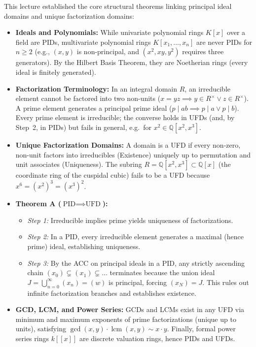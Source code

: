 \begin{overview}
This lecture established the core structural theorems linking principal ideal domains and unique factorization domains:
\begin{itemize}
    \item \textbf{Ideals and Polynomials:} While univariate polynomial rings $K[x]$ over a field are PIDs, multivariate polynomial rings $K[x_1, \dots, x_n]$ are never PIDs for $n \ge 2$ (e.g., $(x, y)$ is non-principal, and $(x^2, xy, y^2)$ requires three generators). By the Hilbert Basis Theorem, they are Noetherian rings (every ideal is finitely generated).
    \item \textbf{Factorization Terminology:} In an integral domain $R$, an irreducible element cannot be factored into two non-units ($x = yz \implies y \in R^\times \lor z \in R^\times$). A prime element generates a principal prime ideal ($p \mid ab \implies p \mid a \lor p \mid b$). Every prime element is irreducible; the converse holds in UFDs (and, by Step~2, in PIDs) but fails in general, e.g.\ for $x^2 \in \mathbb{Q}[x^2, x^3]$.
    \item \textbf{Unique Factorization Domains:} A domain is a UFD if every non-zero, non-unit factors into irreducibles (Existence) uniquely up to permutation and unit associates (Uniqueness). The subring $R = \mathbb{Q}[x^2, x^3] \subset \mathbb{Q}[x]$ (the coordinate ring of the cuspidal cubic) fails to be a UFD because $x^6 = (x^2)^3 = (x^3)^2$.
    \item \textbf{Theorem A ($\text{PID} \implies \text{UFD}$):}
    \begin{itemize}
        \item \emph{Step 1:} Irreducible implies prime yields uniqueness of factorizations.
        \item \emph{Step 2:} In a PID, every irreducible element generates a maximal (hence prime) ideal, establishing uniqueness.
        \item \emph{Step 3:} By the ACC on principal ideals in a PID, any strictly ascending chain $(x_0) \subsetneq (x_1) \subsetneq \dots$ terminates because the union ideal $J = \bigcup_{n=0}^\infty (x_n) = (w)$ is principal, forcing $(x_N) = J$. This rules out infinite factorization branches and establishes existence.
    \end{itemize}
    \item \textbf{GCD, LCM, and Power Series:} GCDs and LCMs exist in any UFD via minimum and maximum exponents of prime factorizations (unique up to units), satisfying $\operatorname{gcd}(x, y) \cdot \operatorname{lcm}(x, y) \sim x \cdot y$. Finally, formal power series rings $k[[x]]$ are discrete valuation rings, hence PIDs and UFDs.
\end{itemize}
\end{overview}